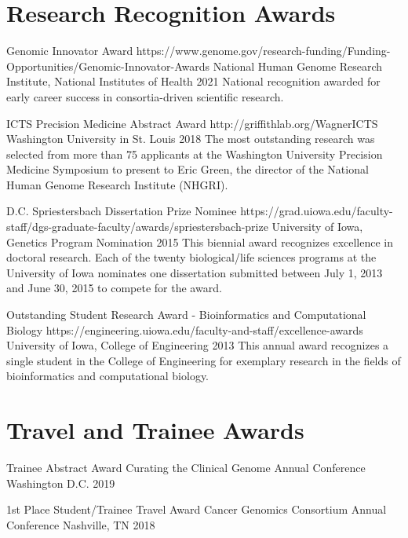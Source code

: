 \documentclass[10pt]{article} %
\begin{document}

\section{Research Recognition Awards}

\merit
{Genomic Innovator Award}
{https://www.genome.gov/research-funding/Funding-Opportunities/Genomic-Innovator-Awards}
{National Human Genome Research Institute, National Institutes of Health}
{2021}
{National recognition awarded for early career success in consortia-driven scientific research.}

\merit
{ICTS Precision Medicine Abstract Award}
{http://griffithlab.org/WagnerICTS}
{Washington University in St. Louis}
{2018}
{The most outstanding research was selected from more than 75 applicants at the Washington University Precision Medicine Symposium to present to Eric Green, the director of the National Human Genome Research Institute (NHGRI).}

\merit
{D.C. Spriestersbach Dissertation Prize Nominee}
{https://grad.uiowa.edu/faculty-staff/dgs-graduate-faculty/awards/spriestersbach-prize}
{University of Iowa, Genetics Program Nomination}
{2015}
{This biennial award recognizes excellence in doctoral research. Each of the twenty biological/life sciences programs at the University of Iowa nominates one dissertation submitted between July 1, 2013 and June 30, 2015 to compete for the award.}

\merit
{Outstanding Student Research Award - Bioinformatics and Computational Biology}
{https://engineering.uiowa.edu/faculty-and-staff/excellence-awards}
{University of Iowa, College of Engineering}
{2013}
{This annual award recognizes a single student in the College of Engineering for exemplary research in the fields of bioinformatics and computational biology.}

\section{Travel and Trainee Awards}

\travelAward
{Trainee Abstract Award}
{Curating the Clinical Genome Annual Conference}
{Washington D.C.}
{2019}

\travelAward
{1st Place Student/Trainee Travel Award}
{Cancer Genomics Consortium Annual Conference}
{Nashville, TN}
{2018}
\end{document}

